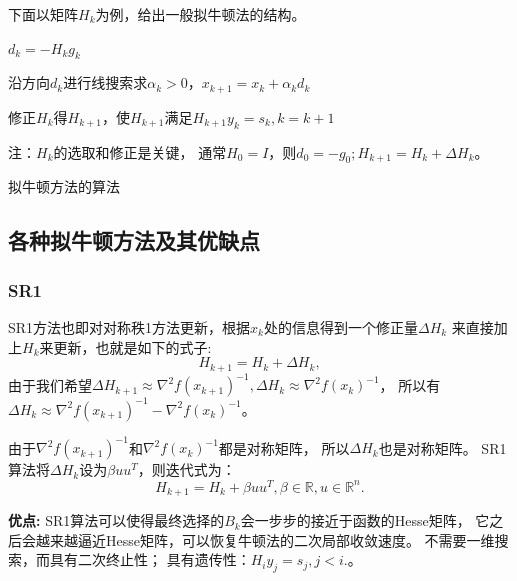         下面以矩阵$H_k$为例，给出一般拟牛顿法的结构。             
        \begin{algorithm}
            \SetAlgoLined

             {
                $d_k=-H_kg_k$
                
                沿方向$d_k$进行线搜索求$\alpha_k>0$，$x_{k+1}=x_k+\alpha_kd_k$
                
                修正$H_k$得$H_{k+1}$，使$H_{k+1}$满足$H_{k+1}y_k=s_k,k=k+1$
            }
            
            注：$H_k$的选取和修正是关键，
            通常$H_0=I$，则$d_0=-g_0;H_{k+1}=H_k+\Delta H_k$。
            \caption{拟牛顿方法的算法}
        \end{algorithm}
        
\subsection{各种拟牛顿方法及其优缺点}
\subsubsection{SR1}
    SR1方法\cite{1980Curvilinear}也即对对称秩1方法更新，根据$x_k$处的信息得到一个修正量$\Delta H_k$
    来直接加上$H_k$来更新，也就是如下的式子:
    \begin{equation}
        H_{k+1} = H_k + \Delta H_k,
        \nonumber
    \end{equation}
    由于我们希望$\Delta H_{k+1} \approx \nabla^2f(x_{k+1})^{-1},
                    \Delta H_{k} \approx \nabla^2f(x_k)^{-1}$，
    所以有$\Delta H_k \approx \nabla^2f(x_{k+1})^{-1}-\nabla^2f(x_k)^{-1}$。

    由于$\nabla^2f(x_{k+1})^{-1}$和$\nabla^2f(x_k)^{-1}$都是对称矩阵，
    所以$\Delta H_k$也是对称矩阵。
    SR1算法将$\Delta H_k$设为$\beta uu^T$，则迭代式为：
    \begin{equation}
        H_{k+1} = H_{k} + \beta uu^T, \beta\in \mathbb{R}, u \in \mathbb{R}^{n}.
    \nonumber
    \end{equation}
    
    \textbf{优点:}
        SR1算法可以使得最终选择的$B_k$会一步步的接近于函数的Hesse矩阵，
        它之后会越来越逼近Hesse矩阵，可以恢复牛顿法的二次局部收敛速度。
        不需要一维搜索，而具有二次终止性；
        具有遗传性：$H_iy_j=s_j,j<i.$。
    
